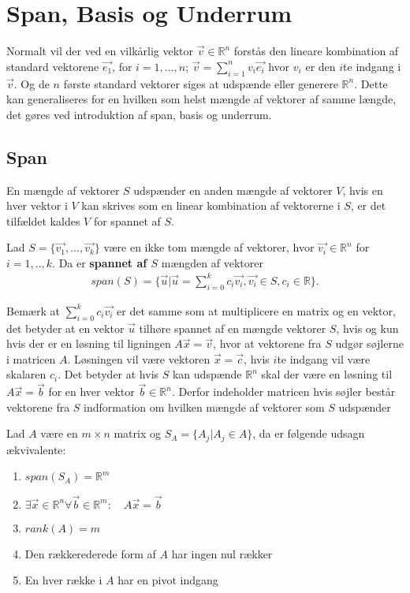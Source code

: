 \section{Span, Basis og Underrum}
Normalt vil der ved en vilkårlig vektor $\vec{v} \in \mathds{R}^n$ forstås den lineare kombination af standard vektorene $\vec{e_1}$, for $i = 1,..., n$; $\vec{v}= \sum_{i=1}^n v_i \vec{e_i}$ hvor $v_i$ er den $i$te indgang i $\vec{v}$. 
Og de $n$ første standard vektorer siges at udspænde eller generere $\mathds{R}^n$.
Dette kan generaliseres for en hvilken som helst mængde af vektorer af samme længde, det gøres ved introduktion af span, basis og underrum.
\subsection{Span}
En mængde af vektorer $S$ udspænder en anden mængde af vektorer $V$, hvis en hver vektor i $V$ kan skrives som en linear kombination af vektorerne i $S$, er det tilfældet kaldes $V$ for spannet af $S$.
\begin{defn}[Span]
Lad $S=\{\vec{v_1},...,\vec{v_k}\}$ være en ikke tom mængde af vektorer, hvor $\vec{v_i} \in \mathds{R}^n$ for $i = 1,..,k$. 
Da er \textbf{spannet af $S$} mængden af vektorer
\begin{align*}
span(S) = \{\vec{u}| \vec{u}=\sum_{i=0}^k c_i \vec{v_i}, \vec{v_i} \in S, c_i \in \mathds{R}\}.
\end{align*} 
\label{def:span}
\end{defn}
Bemærk at $\sum_{i=0}^k c_i \vec{v_i}$ er det samme som at multiplicere en matrix og en vektor, det betyder at en vektor $\vec{u}$ tilhøre spannet af en mængde vektorer $S$, hvis og kun hvis der er en løsning til ligningen $A\vec{x} = \vec{v}$, hvor at vektorene fra $S$ udgør søjlerne i matricen $A$.
Løsningen vil være vektoren $\vec{x}=\vec{c}$, hvis $i$te indgang vil være skalaren $c_i$.
Det betyder at hvis $S$ kan udspænde $\mathds{R}^n$ skal der være en løsning til $A \vec{x} = \vec{b}$ for en hver vektor $\vec{b} \in \mathds{R}^n$. 
Derfor indeholder matricen hvis søjler består vektorene fra $S$ indformation om hvilken mængde af vektorer som $S$ udspænder
\begin{stn}
Lad $A$ være en $m\times n$ matrix og $S_A= \{A_j| A_j \in A\}$, da er følgende udsagn ækvivalente:
\begin{enumerate}[label=\alph*]
\item $span(S_A) = \mathds{R}^m$
\item $\exists \vec{x} \in \mathds{R}^n \forall \vec{b} \in \mathds{R}^m: \quad A\vec{x}=\vec{b}$
\item $rank(A) = m$
\item Den rækkerederede form af $A$ har ingen nul rækker
\item En hver række i $A$ har en pivot indgang
\end{enumerate}
\end{stn}

